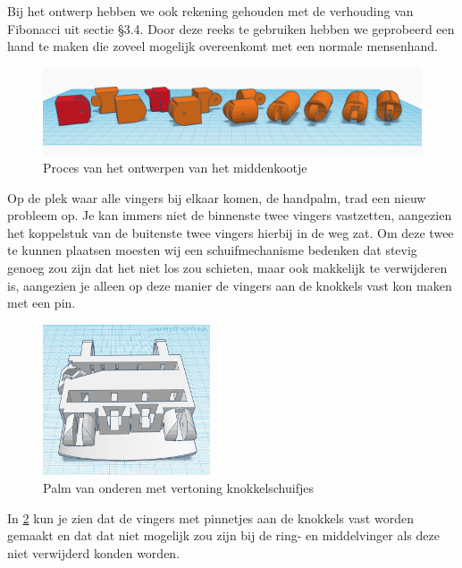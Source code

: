 Bij het ontwerp hebben we ook rekening gehouden met de verhouding van
Fibonacci uit sectie §3.4. Door deze reeks te gebruiken hebben we
geprobeerd een hand te maken die zoveel mogelijk overeenkomt met een
normale mensenhand.

\begin{figure}
\centering
\includegraphics[width=1\textwidth,height=\textheight]{img/image_19.png}
\caption{Proces van het ontwerpen van het
middenkootje\label{fig:middenkootje}}
\end{figure}

Op de plek waar alle vingers bij elkaar komen, de handpalm, trad een
nieuw probleem op. Je kan immers niet de binnenste twee vingers
vastzetten, aangezien het koppelstuk van de buitenste twee vingers
hierbij in de weg zat. Om deze twee te kunnen plaatsen moesten wij een
schuifmechanisme bedenken dat stevig genoeg zou zijn dat het niet los
zou schieten, maar ook makkelijk te verwijderen is, aangezien je alleen
op deze manier de vingers aan de knokkels vast kon maken met een pin.

\begin{figure}
\centering
\includegraphics[width=0.44\textwidth,height=\textheight]{img/image_20.png}
\caption{Palm van onderen met vertoning
knokkelschuifjes\label{fig:palm}}
\end{figure}

In \cref{fig:palm} kun je zien dat de vingers met
pinnetjes aan de knokkels vast worden gemaakt en dat dat niet mogelijk
zou zijn bij de ring- en middelvinger als deze niet verwijderd konden
worden.
